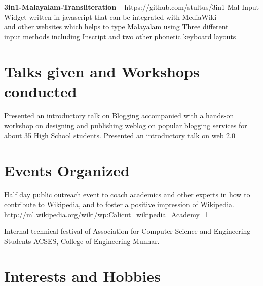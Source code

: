 \documentclass[11pt,a4paper]{moderncv}
\begin{document}
\cvlistitem
{\textbf{3in1-Malayalam-Transliteration} -- {\small https://github.com/stultus/3in1-Mal-Input}
  \\Widget written in javascript that can be integrated with MediaWiki \\
    and other websites which helps to type Malayalam using Three different\\
    input methods including Inscript and two other phonetic keyboard layouts
}





\section{Talks given and Workshops conducted}
{Presented an introductory talk on Blogging accompanied with a hands-on workshop on designing and  publishing weblog on popular blogging services for about 35 High School students.}
{Presented an introductory talk on web 2.0} 


\section{Events Organized}

{Half day public outreach event to coach academics and other experts in how to contribute to Wikipedia, and to foster a positive impression of Wikipedia.\\
 \url{http://ml.wikipedia.org/wiki/wp:Calicut_wikipedia_Academy_1}}

{Internal technical festival of Association for Computer Science and Engineering Students-ACSES, College of Engineering Munnar.}


\section{Interests and Hobbies}

\end{document}
